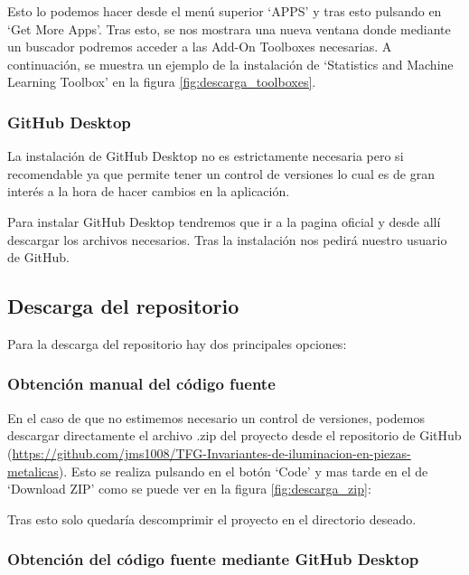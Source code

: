 Esto lo podemos hacer desde el menú superior `APPS' y tras esto pulsando en `Get More Apps'. Tras esto, se nos mostrara una nueva ventana donde mediante un buscador podremos acceder a las Add-On Toolboxes necesarias. A continuación, se muestra un ejemplo de la instalación de `Statistics and Machine Learning Toolbox' en la figura \ref{fig:descarga_toolboxes}.


\subsubsection{GitHub Desktop}\label{github-desktop}

La instalación de GitHub Desktop no es estrictamente necesaria pero si recomendable ya que permite tener un control de versiones lo cual es de gran interés a la hora de hacer cambios en la aplicación.

Para instalar GitHub Desktop tendremos que ir a la pagina oficial \cite{githubDesktop} y desde allí descargar los archivos necesarios. Tras la instalación nos pedirá nuestro usuario de GitHub.

\subsection{Descarga del repositorio}\label{descarga-del-repositorio}

Para la descarga del repositorio hay dos principales opciones:

\subsubsection{Obtención manual del código fuente}\label{obtención-manual-del-código-fuente}

En el caso de que no estimemos necesario un control de versiones, podemos descargar directamente el archivo .zip del proyecto desde el repositorio de GitHub (\url{https://github.com/jms1008/TFG-Invariantes-de-iluminacion-en-piezas-metalicas}). Esto se realiza pulsando en el botón `Code' y mas tarde en el de `Download ZIP' como se puede ver en la figura \ref{fig:descarga_zip}:


Tras esto solo quedaría descomprimir el proyecto en el directorio deseado.

\subsubsection{Obtención del código fuente mediante GitHub Desktop}\label{pbtención-del-código-fuente-mediante-github-desktop}

